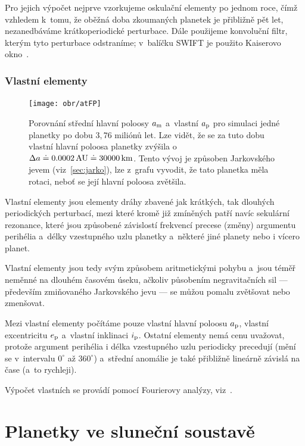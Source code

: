 \documentclass[A4paper, 12pt, oneside]{book}
\begin{document}
Pro jejich výpočet nejprve vzorkujeme oskulační elementy po jednom roce, čímž vzhledem k~tomu, že oběžná doba zkoumaných planetek je přibližně pět let, nezanedbáváme krátkoperiodické perturbace. Dále použijeme konvoluční filtr, kterým tyto perturbace odstraníme; v~balíčku SWIFT je použito Kaiserovo okno~\cite{quinn91}.

\subsection{Vlastní elementy}

\begin{figure}
	\centering
	\texttt{[image: obr/atFP]}
	\caption{Porovnání střední hlavní poloosy $a_{\rm m}$ a~vlastní $a_{\rm p}$ pro simulaci jedné planetky po dobu $3,76$ miliónů let. Lze vidět, že se za tuto dobu vlastní hlavní poloosa planetky zvýšila o~$\Delta a\doteq0.0002\,{\rm AU}\doteq30000\, {\rm km}$. Tento vývoj je způsoben Jarkovského jevem (viz~\ref{sec:jarko}), lze z~grafu vyvodit, že tato planetka měla  rotaci, neboť se její hlavní poloosa zvětšila.}
	\label{atFP}
\end{figure}

Vlastní elementy jsou elementy dráhy zbavené jak krátkých, tak dlouhých periodických perturbací, mezi které kromě již zmíněných patří navíc sekulární rezonance, které jsou způsobené závislostí frekvencí precese (změny) argumentu perihélia a~délky vzestupného uzlu planetky a~některé jiné planety nebo i vícero planet.

Vlastní elementy jsou tedy svým způsobem aritmetickými  pohybu a~jsou téměř neměnné na dlouhém časovém úseku, ačkoliv působením negravitačních sil --- především zmiňovaného Jarkovského jevu --- se můžou pomalu zvětšovat nebo zmenšovat. 

Mezi vlastní elementy počítáme pouze vlastní hlavní poloosu $a_{\rm p}$, vlastní excentricitu $e_{\rm p}$ a~vlastní inklinaci $i_{\rm p}$. Ostatní elementy nemá cenu uvažovat, protože argument perihélia i délka vzestupného uzlu periodicky precedují (mění se v~intervalu $0^\circ$ až $360^\circ$) a~střední anomálie je také přibližně lineárně závislá na čase (a~to rychleji).

Výpočet vlastních se provádí pomocí Fourierovy analýzy, viz~\cite{sidlichovsky96}. 

\chapter{Planetky ve sluneční soustavě} \label{ch:planetky}
\end{document}
